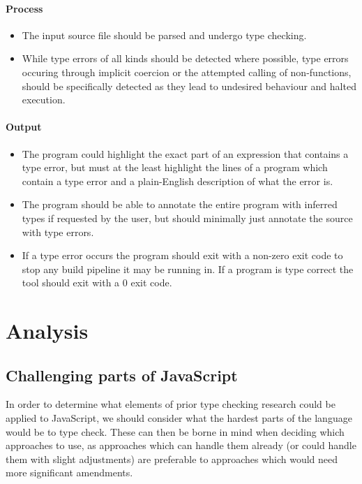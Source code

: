 \documentclass[british, twoside]{bhamthesis}
\theoremstyle{definition}
\begin{document}
  \subsubsection{Process}
  \begin{itemize}
    \item The input source file should be parsed and undergo type checking.
    \item While type errors of all kinds should be detected where possible, type errors occuring through implicit coercion or the attempted calling of non-functions, should be specifically detected as they lead to undesired behaviour and halted execution.
  \end{itemize}

  \subsubsection{Output}
  \begin{itemize}
    \item The program could highlight the exact part of an expression that contains a type error, but must at the least highlight the lines of a program which contain a type error and a plain-English description of what the error is.
    \item The program should be able to annotate the entire program with inferred types if requested by the user, but should minimally just annotate the source with type errors.
    \item If a type error occurs the program should exit with a non-zero exit code to stop any build pipeline it may be running in. If a program is type correct the tool should exit with a 0 exit code.
  \end{itemize}

\chapter{Analysis}

  \section{Challenging parts of JavaScript}

    In order to determine what elements of prior type checking research could be applied to JavaScript, we should consider what the hardest parts of the language would be to type check. These can then be borne in mind when deciding which approaches to use, as approaches which can handle them already (or could handle them with slight adjustments) are preferable to approaches which would need more significant amendments.
\end{document}
